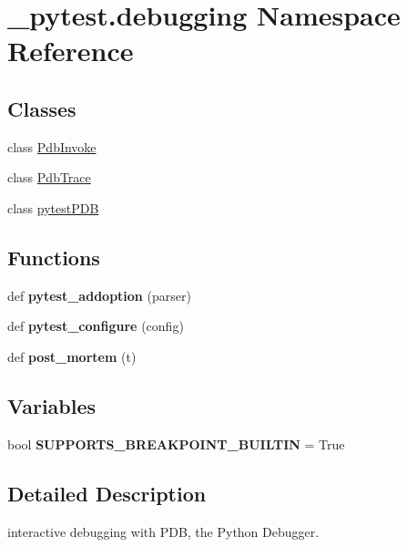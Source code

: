 \hypertarget{namespace__pytest_1_1debugging}{}\section{\+\_\+pytest.\+debugging Namespace Reference}
\label{namespace__pytest_1_1debugging}
\subsection*{Classes}
\begin{DoxyCompactItemize}
\item 
class \hyperlink{class__pytest_1_1debugging_1_1_pdb_invoke}{Pdb\+Invoke}
\item 
class \hyperlink{class__pytest_1_1debugging_1_1_pdb_trace}{Pdb\+Trace}
\item 
class \hyperlink{class__pytest_1_1debugging_1_1pytest_p_d_b}{pytest\+P\+DB}
\end{DoxyCompactItemize}
\subsection*{Functions}
\begin{DoxyCompactItemize}
\item 
\mbox{\label{namespace__pytest_1_1debugging_ac2a54436cc7c17f175a2a24a60d9dead}} 
def {\bfseries pytest\+\_\+addoption} (parser)
\item 
\mbox{\label{namespace__pytest_1_1debugging_a39bc6b472152c1d4d46ebfda967bc20f}} 
def {\bfseries pytest\+\_\+configure} (config)
\item 
\mbox{\label{namespace__pytest_1_1debugging_a347c6504413ad8c6ad4fb52531843a20}} 
def {\bfseries post\+\_\+mortem} (t)
\end{DoxyCompactItemize}
\subsection*{Variables}
\begin{DoxyCompactItemize}
\item 
\mbox{\label{namespace__pytest_1_1debugging_a4787a03574110c672015cac3ed3cafc9}} 
bool {\bfseries S\+U\+P\+P\+O\+R\+T\+S\+\_\+\+B\+R\+E\+A\+K\+P\+O\+I\+N\+T\+\_\+\+B\+U\+I\+L\+T\+IN} = True
\end{DoxyCompactItemize}


\subsection{Detailed Description}
\begin{DoxyVerb}interactive debugging with PDB, the Python Debugger. \end{DoxyVerb}
 